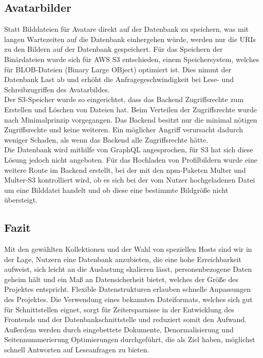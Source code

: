 \subsection{Avatarbilder}
Statt Bilddateien für Avatare direkt auf der Datenbank zu speichern, was mit langen Wartezeiten auf die Datenbank einhergehen würde, werden nur die URIs zu den Bildern auf der Datenbank gespeichert.
Für das Speichern der Binärdateien wurde sich für AWS S3 entschieden, einem Speichersystem, welches für BLOB-Dateien (Binary Large OBject) optimiert ist.
Dies nimmt der Datenbank Last ab und erhöht die Anfragegeschwindigkeit bei Lese- und Schreibzugriffen des Avatarbildes.\\
Der S3-Speicher wurde so eingerichtet, dass das Backend Zugriffsrechte zum Erstellen und Löschen von Dateien hat.
Beim Verteilen der Zugriffsrechte wurde nach Minimalprinzip vorgegangen.
Das Backend besitzt nur die minimal nötigen Zugriffsrechte und keine weiteren.
Ein möglicher Angriff verursacht dadurch weniger Schaden, als wenn das Backend alle Zugriffsrechte hätte.\\
Die Datenbank wird mithilfe von GraphQL angesprochen, für S3 hat sich diese Lösung jedoch nicht angeboten.
Für das Hochladen von Profilbildern wurde eine weitere Route im Backend erstellt, bei der mit den npm-Paketen Multer und Multer-S3 kontrolliert wird, ob es sich bei der vom Nutzer hochgeladenen Datei um eine Bilddatei handelt und ob diese eine bestimmte Bildgröße nicht übersteigt.

\subsection{Fazit}
Mit den gewählten Kollektionen und der Wahl von speziellen Hosts sind wir in der Lage, Nutzern eine Datenbank anzubieten, die eine hohe Erreichbarkeit aufweist, sich leicht an die Auslastung skalieren lässt, personenbezogene Daten geheim hält und ein Maß an Datensicherheit bietet, welches der Größe des Projektes entspricht.
Flexible Datenstrukturen erlauben schnelle Anpassungen des Projektes.
Die Verwendung eines bekannten Dateiformats, welches sich gut für Schnittstellen eignet, sorgt für Zeitersparnisse in der Entwicklung des Frontends und der Datenbankschnittstelle und reduziert somit den Aufwand.
Außerdem werden durch eingebettete Dokumente, Denormalisierung und Seitennummerierung Optimierungen durchgeführt, die als Ziel haben, möglichst schnell Antworten auf Leseanfragen zu bieten.